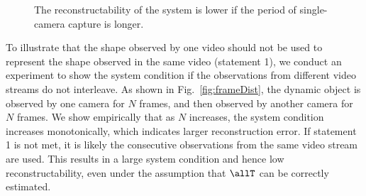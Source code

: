 \begin{figure}[]
\centering
{}
\caption{The reconstructability of the system is lower if the period of single-camera capture is longer.}
\end{figure}
To illustrate that the shape observed by one video should not be used to represent the shape observed in the same video (statement 1), we conduct an experiment to show the system condition if the observations from different video streams do not interleave. As shown in Fig.~\ref{fig:frameDist}, the dynamic object is observed by one camera for $N$ frames, and then observed by another camera for $N$ frames. We show empirically that as $N$ increases, the system condition increases monotonically, which indicates larger reconstruction error. If statement 1 is not met, it is likely the consecutive observations from the same video stream are used. This results in a large system condition and hence low reconstructability, even under the assumption that $\allT$ can be correctly estimated.

